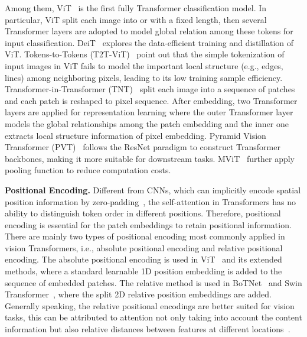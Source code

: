 \documentclass{article}
\begin{document}
Among them, ViT~\cite{DBLP:journals/corr/abs-2010-11929} is the first fully Transformer classification model. In particular, ViT split each image into  or  with a fixed length, then several Transformer layers are adopted to model global relation among these tokens for input classification. DeiT~\cite{DBLP:journals/corr/abs-2012-12877} explores the data-efficient training and distillation of ViT. Tokens-to-Tokens (T2T-ViT)~\cite{DBLP:journals/corr/abs-2101-11986} point out that the simple tokenization of input images in ViT fails to model the important local structure (e.g., edges, lines) among neighboring pixels, leading to its low training sample efficiency. Transformer-in-Transformer (TNT)~\cite{DBLP:journals/corr/abs-2103-00112} split each image into a sequence of patches and each patch is reshaped to pixel sequence. After embedding, two Transformer layers are applied for representation learning where the outer Transformer layer models the global relationships among the patch embedding and the inner one extracts local structure information of pixel embedding. Pyramid Vision Transformer (PVT)~\cite{wang2021pyramid} follows the ResNet paradigm to construct Transformer backbones, making it more suitable for downstream tasks. MViT~\cite{mvit2021} further apply pooling function to reduce computation costs.

\textbf{Positional Encoding.}
Different from CNNs, which can implicitly encode spatial position information by zero-padding~\cite{DBLP:conf/iclr/IslamJB20}, the self-attention in Transformers has no ability to distinguish token order in different positions. Therefore, positional encoding is essential for the patch embeddings to retain positional information. There are mainly two types of positional encoding most commonly applied in vision Transformers, i.e., absolute positional encoding and relative positional encoding. The absolute positional encoding is used in ViT~\cite{DBLP:journals/corr/abs-2010-11929} and its extended methods, where a standard learnable 1D position embedding is added to the sequence of embedded patches. The relative method is used in BoTNet~\cite{DBLP:journals/corr/abs-2101-11605} and Swin Transformer~\cite{DBLP:journals/corr/abs-2103-14030}, where the split 2D relative position embeddings are added. Generally speaking, the relative positional encodings are better suited for vision tasks, this can be attributed to attention not only taking into account the content information but also relative distances between features at different locations~\cite{DBLP:conf/nips/ParmarRVBLS19}.
\end{document}
